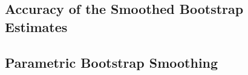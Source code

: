 \documentclass[11pt,letter]{article}\usepackage[]{graphicx}\usepackage[]{color}
\begin{document}
\subsection{Accuracy of the Smoothed Bootstrap Estimates}



\subsection{Parametric Bootstrap Smoothing}
\end{document}
